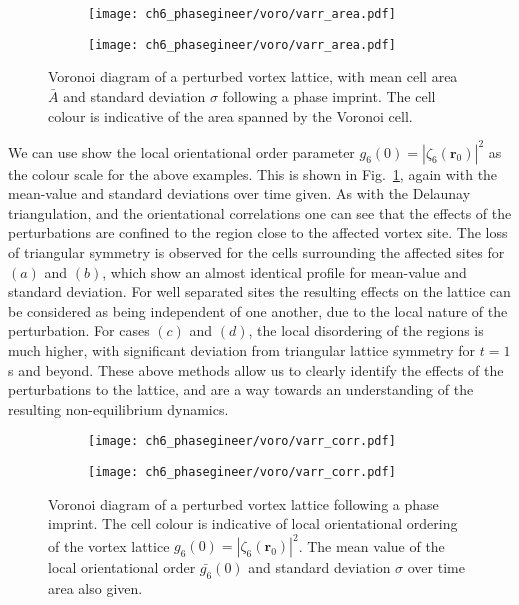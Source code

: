 \begin{figure}\ContinuedFloat\centering
    \begin{subfigure}{0.6\textwidth}
        \texttt{[image: ch6\_phasegineer/voro/varr\_area.pdf]}
    \end{subfigure}
    \begin{subfigure}{0.6\textwidth}
        \texttt{[image: ch6\_phasegineer/voro/varr\_area.pdf]}
    \end{subfigure}
    \caption{Voronoi diagram of a perturbed vortex lattice, with mean cell area $\bar{A}$ and standard deviation $\sigma$ following a phase imprint. The cell colour is indicative of the area spanned by the Voronoi cell.}
\end{figure}

We can use show the local orientational order parameter $g_6(0) = |\zeta_6(\mathbf{r}_0)|^2$ as the colour scale for the above examples. This is shown in Fig.~\ref{fig:voronoiscorr}, again with the mean-value and standard deviations over time given. As with the Delaunay triangulation, and the orientational correlations one can see that the effects of the perturbations are confined to the region close to the affected vortex site. The loss of triangular symmetry is observed for the cells surrounding the affected sites for $(a)$ and $(b)$, which show an almost identical profile for mean-value and standard deviation. For well separated sites the resulting effects on the lattice can be considered as being independent of one another, due to the local nature of the perturbation. For cases $(c)$ and $(d)$, the local disordering of the regions is much higher, with significant deviation from triangular lattice symmetry for $t=1$ s and beyond. These above methods allow us to clearly identify the effects of the perturbations to the lattice, and are a way towards an understanding of the resulting non-equilibrium dynamics.

\begin{figure}\centering
    \begin{subfigure}{0.6\textwidth}
        \texttt{[image: ch6\_phasegineer/voro/varr\_corr.pdf]}
    \end{subfigure}
    \begin{subfigure}{0.6\textwidth}
        \texttt{[image: ch6\_phasegineer/voro/varr\_corr.pdf]}
    \end{subfigure}
    \caption{Voronoi diagram of a perturbed vortex lattice following a phase imprint. The cell colour is indicative of local orientational ordering of the vortex lattice $g_6(0) = |\zeta_6(\mathbf{r}_0)|^2$. The mean value of the local orientational order $\bar{g_6}(0)$ and standard deviation $\sigma$ over time area also given.}\label{fig:voronoiscorr}
\end{figure}

